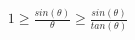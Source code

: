 \documentclass[preview]{standalone}
\begin{document}
\begin{align*}
1 \geq\frac{sin(\theta)}{\theta}\geq\frac{sin(\theta)}{tan(\theta)}
\end{align*}
\end{document}
